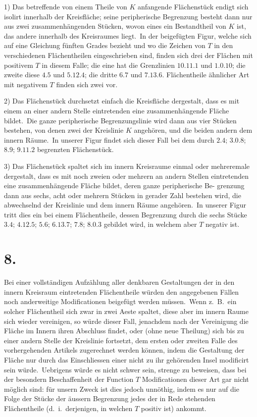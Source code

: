 \documentclass[12pt,a4paper]{article}
\theoremstyle{plain}
\begin{document}
1) Das betreffende von einem Theile von $K$ anfangende Flächenstück endigt sich isolirt innerhalb der Kreisfläche; seine peripherische Begrenzung besteht
dann nur aus zwei zusammenhängenden Stücken, wovon eines ein Bestandtheil
von $K$ ist, das andere innerhalb des Kreisraumes liegt.\ In der beigefügten Figur, welche sich auf eine Gleichung fünften Grades bezieht und wo die Zeichen
von $T$ in den verschiedenen Flächentheilen eingeschrieben sind, finden sich drei
der Flächen mit positivem $T$ in diesem Falle; die eine hat die Grenzlinien $10.11.1$
und $1.0.10$; die zweite diese $4.5$ und $5.12.4$; die dritte $6.7$ und $7.13.6$.
Flächentheile ähnlicher Art mit negativem $T$ finden sich zwei vor.

2) Das Flächenstück durchsetzt einfach die Kreisfläche dergestalt, dass es
mit einem an einer andern Stelle eintretenden eine zusammenhängende Fläche
bildet.\ Die ganze peripherische Begrenzungslinie wird dann aus vier Stücken bestehen, von denen zwei der Kreislinie $K$ angehören, und die beiden andern dem
innern Räume.\ In unserer Figur findet sich dieser Fall bei dem durch $2.4$;
$3.0.8$; $8.9$; $9.11.2$
begrenzten Flächenstück.

3) Das Flächenstück spaltet sich im innern Kreisraume einmal oder mehreremale dergestalt, dass es mit noch zweien oder mehrern an andern Stellen eintretenden eine zusammenhängende Fläche bildet, deren ganze peripherische Be-
grenzung dann aus sechs, acht oder mehrern Stücken in gerader Zahl bestehen
wird, die abwechselnd der Kreislinie und dem innern Räume angehören.\ In
unserer Figur tritt dies ein bei einem Flächentheile, dessen Begrenzung durch
die sechs Stücke $3.4$; $4.12.5$; $5.6$; $6.13.7$; $7.8$; $8.0.3$ gebildet wird, in
welchem aber $T$ negativ ist.

\section*{8.}

Bei einer vollständigen Aufzählung aller denkbaren Gestaltungen der in den
innern Kreisraum eintretenden Flächentheile würden den angegebenen Fällen
noch anderweitige Modificationen beigefügt werden müssen.\ Wenn z.\ B.\ ein solcher Flächentheil sich zwar in zwei Aeste spaltet, diese aber im innern Raume
sich wieder vereinigen, so würde dieser Fall, jenachdem nach der Vereinigung
die Fläche im Innern ihren Abschluss findet, oder (ohne neue Theilung) sich bis
zu einer andern Stelle der Kreislinie fortsetzt, dem ersten oder zweiten Falle des
vorhergehenden Artikels zugerechnet werden können, indem die Gestaltung der
Fläche nur durch das Einschliessen einer nicht zu ihr gehörenden Insel modificirt
sein würde.\ Uebrigens würde es nicht schwer sein, strenge zu beweisen, dass
bei der besondern Beschaffenheit der Function $T$ Modificationen dieser Art gar
nicht möglich sind: für unsern Zweck ist dies jedoch unnöthig, indem es nur auf
die Folge der Stücke der äussern Begrenzung jedes der in Rede stehenden Flächentheile (d.\ i.\ derjenigen, in welchen $T$ positiv ist) ankommt.
\end{document}
